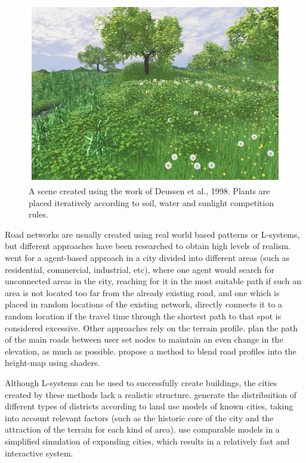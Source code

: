 \documentclass{acmtog}
\begin{document}
\begin{figure}[!htp]
	\begin{center}
		\includegraphics[width=\columnwidth]{images/ecosys.png}
	\end{center}
	\caption{A scene created using the work of Deussen et al., 1998. Plants are placed iteratively according to soil, water and sunlight competition rules.}
\end{figure}

Road networks are usually created using real world based patterns or L-systems, but different approaches have been researched to obtain high levels of realism. \cite{Lechner03} went for a agent-based approach in a city divided into different areas (such as residential, commercial, industrial, etc), where one agent would search for unconnected areas in the city, reaching for it in the most suitable path if such an area is not located too far from the already existing road, and one which is placed in random locations of the existing network, directly connects it to a random location if the travel time through the shortest path to that spot is considered excessive. Other approaches rely on the terrain profile. \cite{Kelly07} plan the path of the main roads between user set nodes to maintain an even change in the elevation, as much as possible. \cite{Bruneton08} propose a method to blend road profiles into the height-map using shaders.

Although L-systems can be used to successfully create buildings, the cities created by these methods lack a realistic structure. \cite{Groenewegen09} generate the distribuition of different types of districts according to land use models of known cities, taking into account relevant factors (such as the historic core of the city and the attraction of the terrain for each kind of area). \cite{Weber09} use comparable models in a simplified simulation of expanding cities, which results in a relatively fast and interactive system.
\end{document}
